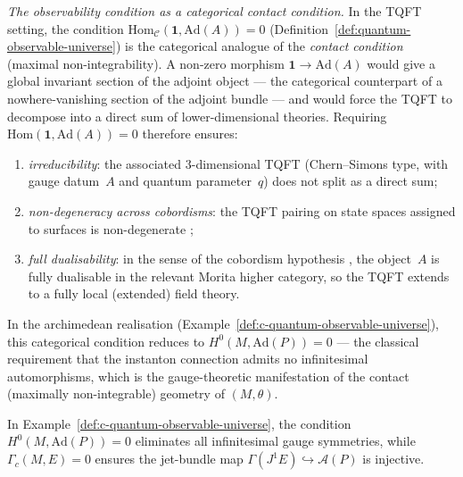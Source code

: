 \begin{remark}
\medskip\noindent\textit{The observability condition as a categorical
contact condition.}\;
In the TQFT setting, the condition
$\mathrm{Hom}_{\mathcal{C}}(\mathbf{1}, \mathrm{Ad}(A)) = 0$
(Definition~\ref{def:quantum-observable-universe}) is the categorical
analogue of the \emph{contact condition} (maximal non-integrability).
A non-zero morphism $\mathbf{1} \to \mathrm{Ad}(A)$ would give a
global invariant section of the adjoint object --- the categorical
counterpart of a nowhere-vanishing section of the adjoint bundle --- and
would force the TQFT to decompose into a direct sum of
lower-dimensional theories.  Requiring
$\mathrm{Hom}(\mathbf{1}, \mathrm{Ad}(A)) = 0$ therefore ensures:
\begin{enumerate}
  \item \emph{irreducibility}: the associated $3$-dimensional TQFT
        (Chern--Simons type, with gauge datum~$A$ and quantum
        parameter~$q$) does not split as a direct sum;
  \item \emph{non-degeneracy across cobordisms}: the TQFT pairing on
        state spaces assigned to surfaces is non-degenerate
        \cite{freed2010};
  \item \emph{full dualisability}: in the sense of the cobordism
        hypothesis \cite{baez1995, lurie2009}, the object~$A$ is
        fully dualisable in the relevant Morita higher category, so the
        TQFT extends to a fully local (extended) field theory.
\end{enumerate}
In the archimedean realisation
(Example~\ref{def:c-quantum-observable-universe}), this categorical
condition reduces to
$H^0(M, \mathrm{Ad}(P)) = 0$ --- the classical requirement that the
instanton connection admits no infinitesimal automorphisms, which is the
gauge-theoretic manifestation of the contact (maximally non-integrable)
geometry of $(M, \theta)$.
\end{remark}

\begin{remark}
\label{rem:vanishing-explication}
\label{rem:jet-bundle}
In Example~\ref{def:c-quantum-observable-universe}, the condition
$H^0(M, \mathrm{Ad}(P)) = 0$ eliminates all infinitesimal gauge
symmetries, while $\Gamma_c(M,E) = 0$ ensures the jet-bundle
map $\Gamma(J^1 E) \hookrightarrow \mathcal{A}(P)$ is injective.
\end{remark}

